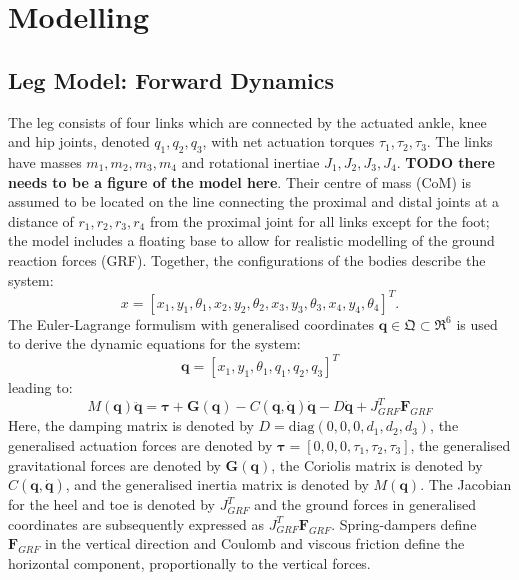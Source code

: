 \documentclass[letterpaper, 10 pt, conference]{ieeeconf}  %
\begin{document}
\section{Modelling} \label{sec:modelling}

\subsection{Leg Model: Forward Dynamics} 
The leg consists of four links which are connected by the actuated ankle, knee and hip joints, denoted $q_1,q_2,q_3$, with net actuation torques $\tau_1,\tau_2,\tau_3$. %
The links have masses $m_1,m_2,m_3,m_4$ and rotational inertiae $J_1,J_2,J_3,J_4$. \textbf{TODO there needs to be a figure of the model here}. Their centre of mass (CoM) is assumed to be located on the line connecting the proximal and distal joints at a distance of $r_1,r_2,r_3,r_4$ from the proximal joint for all links except for the foot; the model includes a floating base to allow for realistic modelling of the ground reaction forces (GRF). Together, the configurations of the bodies describe the system:
\begin{equation}
x = [x_1,y_1,\theta_1,x_2,y_2,\theta_2, x_3,y_3,\theta_3,x_4,y_4,\theta_4]^T. 
\end{equation}
The Euler-Lagrange formulism with generalised coordinates $\mathbf{q} \in \mathfrak{Q} \subset \mathfrak{R}^{6}$ is used to derive the dynamic equations for the system:
\begin{equation}
\mathbf{q}=[x_1,y_1,\theta_1,q_1,q_2,q_3]^T \label{eq:q}
\end{equation}
leading to:
\begin{equation}
M(\mathbf{q})\mathbf{\ddot q} = \mathbf{\boldsymbol{\tau} + G(q)} - C\mathbf{(q,\dot q)\dot q -} D \mathbf{\dot q} + J_{GRF}^T \mathbf{F}_{GRF}
\label{eq:fwddyn}
\end{equation}
Here, the damping matrix is denoted by $D = \text{diag} (0,0,0,d_1,d_2,d_3)$, the generalised actuation forces are denoted by $\boldsymbol{\tau} = [0,0,0,\tau_1,\tau_2,\tau_3]$, the generalised gravitational forces are denoted by $\mathbf{G(q)}$, the Coriolis matrix is denoted by $C\mathbf{(q, \dot q)}$, and the generalised inertia matrix is denoted by $M(\mathbf{q})$. The Jacobian for the heel and toe is denoted by $J_{GRF}^T$ and the ground forces in generalised coordinates are subsequently expressed as $J_{GRF}^T \mathbf{F}_{GRF}$. Spring-dampers define $\mathbf{F}_{GRF}$ in the vertical direction and Coulomb and viscous friction define the horizontal component, proportionally to the vertical forces.
\end{document}
